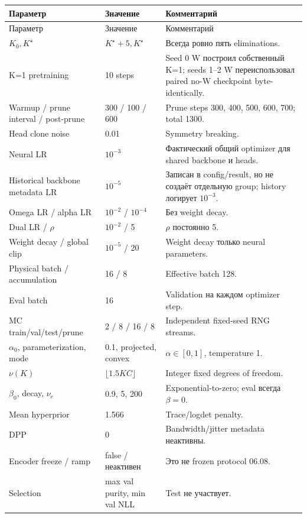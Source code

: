 \documentclass[11pt,a4paper]{article}
\newcommand{\Ktarget}{K^{\star}}
\begin{document}
\begin{longtable}{p{}p{}p{}}
\toprule
Параметр & Значение & Комментарий \\
\midrule
\endfirsthead
\toprule
Параметр & Значение & Комментарий \\
\midrule
\endhead
$K_0,\Ktarget$ & $\Ktarget+5,\Ktarget$ & Всегда ровно пять eliminations. \\
K=1 pretraining & 10 steps & Seed 0 W построил собственный K=1; seeds 1--2 W переиспользовал paired no-W checkpoint byte-identically. \\
Warmup / prune interval / post-prune & 300 / 100 / 600 & Prune steps 300, 400, 500, 600, 700; total 1300. \\
Head clone noise & 0.01 & Symmetry breaking. \\
Neural LR & $10^{-3}$ & Фактический общий optimizer для shared backbone и heads. \\
Historical backbone metadata LR & $10^{-5}$ & Записан в config/result, но не создаёт отдельную group; history логирует $10^{-3}$. \\
Omega LR / alpha LR & $10^{-2}$ / $10^{-4}$ & Без weight decay. \\
Dual LR / $\rho$ & $10^{-2}$ / 5 & $\rho$ постоянно 5. \\
Weight decay / global clip & $10^{-5}$ / 20 & Weight decay только neural parameters. \\
Physical batch / accumulation & 16 / 8 & Effective batch 128. \\
Eval batch & 16 & Validation на каждом optimizer step. \\
MC train/val/test/prune & 2 / 8 / 16 / 8 & Independent fixed-seed RNG streams. \\
$\alpha_0$, parameterization, mode & 0.1, projected, convex & $\alpha\in[0,1]$, temperature 1. \\
$\nu(K)$ & $\lfloor1.5KC\rfloor$ & Integer fixed degrees of freedom. \\
$\beta_0$, decay, $\nu_e$ & 0.9, 5, 200 & Exponential-to-zero; eval всегда $\beta=0$. \\
Mean hyperprior & 1.566 & Trace/logdet penalty. \\
DPP & 0 & Bandwidth/jitter metadata неактивны. \\
Encoder freeze / ramp & false / неактивен & Это не frozen protocol 06.08. \\
Selection & max val purity, min val NLL & Test не участвует. \\
\bottomrule
\end{longtable}
\end{document}
